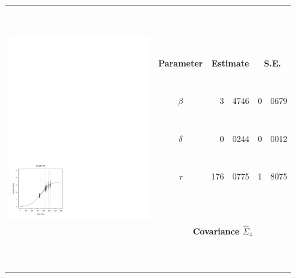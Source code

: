 


		\begin{tabular}{ccr@{.}lr@{.}l}
		\hline
		\hline
		 & &  \multicolumn{2}{c}{\ } & \multicolumn{2}{c}{\ } \\
		  & &  \multicolumn{2}{c}{\ } & \multicolumn{2}{c}{\ } \\
		 \multirow{10}{*}{ \includegraphics[height=80mm]{graphics/location_4.pdf}} &  \multicolumn{2}{c}{\ } & \multicolumn{2}{c}{\ } \\
		 & {\bf{Parameter}} & \multicolumn{2}{c}{{\bf{Estimate}}} & \multicolumn{2}{c}{{\bf{S.E.}}}  \\
		\cline{2-6}
		 & &  \multicolumn{2}{c}{\ } & \multicolumn{2}{c}{\ } \\
		& {\bf{$\beta$}} &	  3&4746		& 0&0679		\\
		 & &  \multicolumn{2}{c}{\ } & \multicolumn{2}{c}{\ } \\
		& {\bf{$\delta$}} &	  0&0244		& 0&0012		 \\
		 & &  \multicolumn{2}{c}{\ } & \multicolumn{2}{c}{\ } \\
		& {\bf{$\tau$}}	&	176&0775		& 1&8075		 \\
		 & &  \multicolumn{2}{c}{\ } & \multicolumn{2}{c}{\ } \\
		 & &  \multicolumn{2}{c}{\ } & \multicolumn{2}{c}{\ } \\
		 & \multicolumn{5}{c}{\bf{Covariance} $\hat{\Sigma}_4$ } \\
		\cline{2-6}
		& \multicolumn{5}{c}{ } \\
		 & &  \multicolumn{2}{c}{\ } & \multicolumn{2}{c}{\ } \\
		  & &  \multicolumn{2}{c}{\ } & \multicolumn{2}{c}{\ } \\
		 \hline
		\hline
		\end{tabular}

